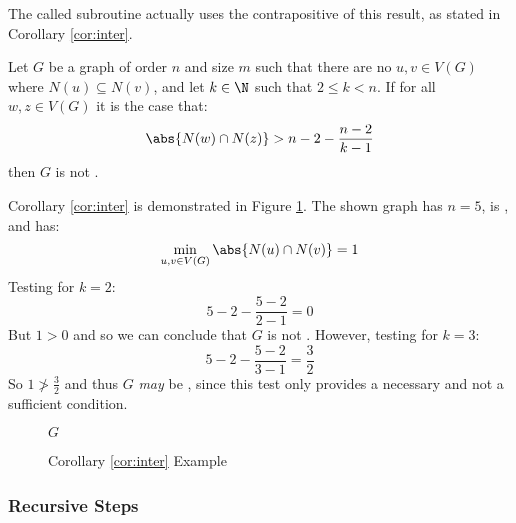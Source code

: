 The called subroutine actually uses the contrapositive of this result, as stated in Corollary \ref{cor:inter}.

\begin{corollary}
  \label{cor:inter}
  Let \(G\) be a graph of order \(n\) and size \(m\) such that there are no \(u,v\in V(G)\) where
  \(N(u)\subseteq N(v)\), and let \(k\in\N\) such that \(2\le k<n\).  If for all \(w,z\in V(G)\) it is the case
  that:
  \[\abs{N(w)\cap N(z)}>n-2-\frac{n-2}{k-1}\]
  then \(G\) is not .
\end{corollary}

Corollary \ref{cor:inter} is demonstrated in Figure \ref{fig:inter}.  The shown graph has \(n=5\), is ,
and has:
\[\min_{u,v\in V(G)}\abs{N(u)\cap N(v)}=1\]
Testing for \(k=2\):
\[5-2-\frac{5-2}{2-1}=0\]
But \(1>0\) and so we can conclude that \(G\) is not .  However, testing for \(k=3\):
\[5-2-\frac{5-2}{3-1}=\frac{3}{2}\]
So \(1\ngtr\frac{3}{2}\) and thus \(G\) \emph{may} be , since this test only provides a necessary and
not a sufficient condition.

\begin{figure}[h]
  \label{fig:inter}
  \begin{center}

    \bigskip

    \(G\)
  \end{center}
  \caption{Corollary \ref{cor:inter} Example}
\end{figure}

\subsubsection{Recursive Steps}

